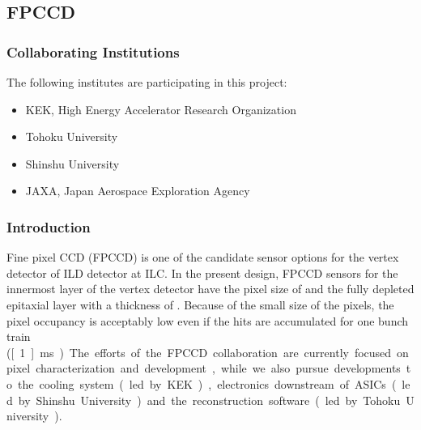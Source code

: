 \subsection{FPCCD}
\subsubsection{Collaborating Institutions}
The following institutes are participating in this project:
\begin{itemize}
    \item KEK, High Energy Accelerator Research Organization
    \item Tohoku University
    \item Shinshu University
    \item JAXA, Japan Aerospace Exploration Agency
\end{itemize}
\subsubsection{Introduction}
    Fine pixel CCD (FPCCD) is one of the candidate sensor options for the vertex detector of ILD detector at ILC. In the present design, FPCCD sensors for the innermost layer of the vertex detector have the pixel size of \unit[5]{\micron} and the fully depleted epitaxial layer with a thickness of \unit[15]{\micron}. Because of the small size of the pixels, the pixel occupancy is acceptably low even if the hits are accumulated for one bunch train (\unit[~1]{ms}). 
    The efforts of the FPCCD collaboration are currently focused on pixel characterization and development, while we also pursue developments to the cooling system (led by KEK), electronics downstream of ASICs (led by Shinshu University) and the reconstruction software (led by Tohoku University).
